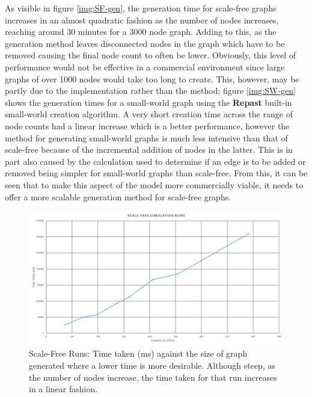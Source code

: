 \documentclass[]{report}
\begin{document}
As visible in figure \ref{img:SF-gen}, the generation time for scale-free graphs increases in an almost quadratic fashion as the number of nodes increases, reaching around 30 minutes for a 3000 node graph. Adding to this, as the generation method leaves disconnected nodes in the graph which have to be removed causing the final node count to often be lower. Obviously, this level of performance would not be effective in a commercial environment since large graphs of over 1000 nodes would take too long to create. This, however, may be partly due to the implementation rather than the method; figure \ref{img:SW-gen} shows the generation times for a small-world graph using the \textbf{Repast} built-in small-world creation algorithm. A very short creation time across the range of node counts had a linear increase which is a better performance, however the method for generating small-world graphs is much less intensive than that of scale-free because of the incremental addition of nodes in the latter. This is in part also caused by the calculation used to determine if an edge is to be added or removed being simpler for small-world graphs than scale-free. From this, it can be seen that to make this aspect of the model more commercially viable, it needs to offer a more scalable generation method for scale-free graphs.

\begin{figure}
\begin{center}
\includegraphics[width=\textwidth]{scale-free-runs.png}
\end{center}
\caption{Scale-Free Runs: Time taken (ms) against the size of graph generated where a lower time is more desirable. Although steep, as the number of nodes increase, the time taken for that run increases in a linear fashion.}
\label{img:SF-run}
\end{figure}
\end{document}
